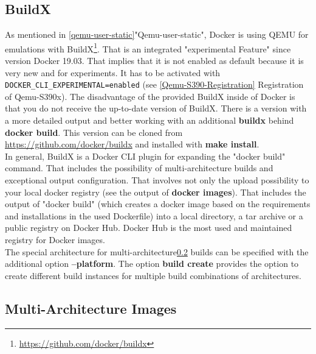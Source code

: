 \subsection{BuildX}\label{BuildX}

As mentioned in \ref{qemu-user-static}"Qemu-user-static", Docker is using QEMU for emulations with BuildX\footnote{\url{https://github.com/docker/buildx}}. That is an integrated "experimental Feature" since version Docker 19.03. That implies that it is not enabled as default because it is very new and for experiments. It has to be activated with \lstinline!DOCKER_CLI_EXPERIMENTAL=enabled! (see \ref{Qemu-S390-Registration} Registration of Qemu-S390x). The disadvantage of the provided BuildX inside of Docker is that you do not receive the up-to-date version of BuildX. There is a version with a more detailed output and better working with an additional \textbf{buildx} behind \textbf{docker build}. This version can be cloned from \url{https://github.com/docker/buildx} and installed with \textbf{make install}. \\
In general, BuildX is a Docker CLI plugin for expanding the "docker build" command. That includes the possibility of multi-architecture builds and exceptional output configuration. That involves not only the upload possibility to your local docker registry (see the output of \textbf{docker images}). That includes the output of "docker build" (which creates a docker image based on the requirements and installations in the used Dockerfile) into a local directory, a tar archive or a public registry on Docker Hub. Docker Hub is the most used and maintained registry for Docker images. \\
The special architecture for multi-architecture\ref{MultiArchitectureImages} builds can be specified with the additional option \textbf{--platform}.
The option \textbf{build create} provides the option to create different build instances for multiple build combinations of architectures.

\subsection{Multi-Architecture Images}\label{MultiArchitectureImages}

